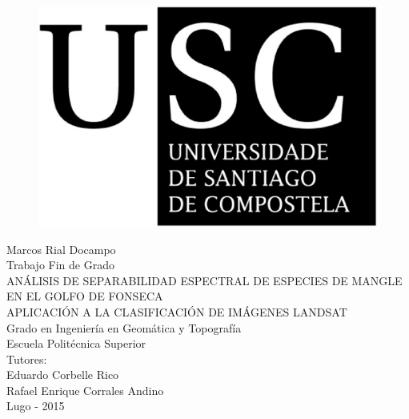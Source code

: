 




\begin{figure}[t]
\centering
\includegraphics[scale=0.15]{./Imagenes/USCbn.eps} %
\end{figure}

\begin{center}
\vspace*{2cm}
{\LARGE Marcos Rial Docampo}\\[2cm]
{\LARGE Trabajo Fin de Grado}\\[1cm]
{\LARGE ANÁLISIS DE SEPARABILIDAD ESPECTRAL DE ESPECIES DE MANGLE EN EL GOLFO DE FONSECA}\\
{\LARGE APLICACIÓN A LA CLASIFICACIÓN DE IMÁGENES LANDSAT}\\[2cm]
{\Large Grado en Ingeniería en Geomática y Topografía\\Escuela Politécnica Superior}\\[1cm]
{\Large \vfill{Tutores:\\Eduardo Corbelle Rico\\Rafael Enrique Corrales Andino}}\\
{\footnotesize \vfill{Lugo - 2015}}
\end{center}